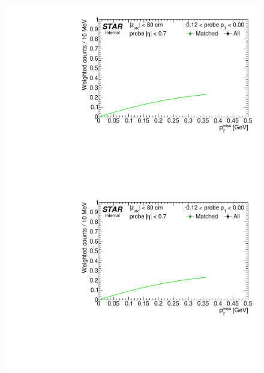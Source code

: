 \begin{figure}[h!]
{}%
\end{figure}%
\begin{figure}[ht]\ContinuedFloat
\centering
\parbox{0.495\textwidth}{
  \centering
  \includegraphics[width=\linewidth,page=7]{graphics/correctionsToEff/TOF_tagAndProbe/Fitting_effVsPt_data.CPT.pdf}\\
  \includegraphics[width=\linewidth,page=8]{graphics/correctionsToEff/TOF_tagAndProbe/Fitting_effVsPt_data.CPT.pdf}\\
}
\end{figure}
